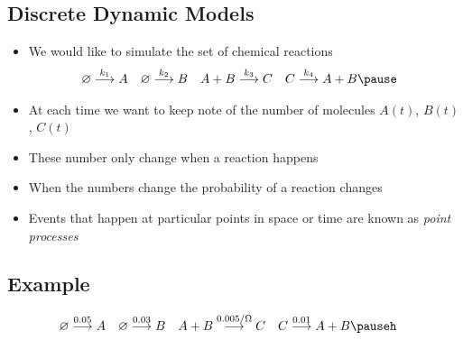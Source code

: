 \begin{slide}
\section{Discrete Dynamic Models}

\begin{PauseHighLight}
  \begin{itemize}
  \item We would like to simulate the set of chemical reactions
    \begin{align*}
      \varnothing &\goesto{k_1} A  &
      \varnothing &\goesto{k_2} B & 
       A + B &\goesto{k_3} C &
       C &\goesto{k_4} A + B\pause
    \end{align*}
  \item At each time we want to keep note of the number of molecules
    $A(t)$, $B(t)$, $C(t)$\pause
  \item These number only change when a reaction happens\pause
  \item When the numbers change the probability of a reaction
    changes\pause
  \item Events that happen at particular points in space or time are
    known as \emph{point processes}\pause
  \end{itemize}
\end{PauseHighLight}

\end{slide}


\begin{slide}
\section[-3]{Example}

\pb
\begin{align*}
  \varnothing &\goesto{0.05} A  &
  \varnothing &\goesto{0.03} B & 
  A + B &\goesto{0.005/\Omega} C &
  C &\goesto{0.01} A + B\pauseh
\end{align*}
\vspace*{-1cm}
\begin{center}
  \pause
\end{center}

\end{slide}


